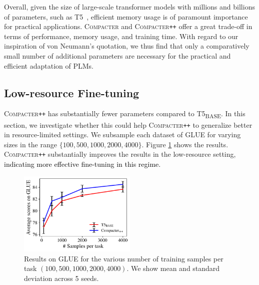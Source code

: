 \documentclass{article}
\newcommand{\change}[1]{\textcolor{black}{#1}}
\newcommand{\basebase}{T5\textsubscript{\tiny BASE}\xspace}
\newcommand{\compacter}{\textsc{Compacter}\xspace}
\newcommand{\compacteronlyff}{\textsc{Compacter}\texttt{++}\xspace} %
\begin{document}
Overall, given the size of large-scale transformer models with millions and billions of parameters, such as T5~\citep{raffel2019exploring}, efficient memory usage is of paramount importance for practical applications. \compacter and \compacteronlyff offer a great trade-off in terms of performance, memory usage, and training time. With regard to our inspiration of von Neumann's quotation, we thus find that only a comparatively small number of additional parameters are necessary for the practical and efficient adaptation of PLMs.

\subsection{Low-resource Fine-tuning} \label{sec:low_resource}
\compacteronlyff has substantially fewer parameters compared to \basebase. In this section, we investigate whether this could help \compacteronlyff to generalize better in resource-limited settings. We subsample each dataset of GLUE for varying sizes in the range $\{100, 500, 1000, 2000, 4000\}$. Figure \ref{fig:lowresource_results} shows the results. \compacteronlyff substantially improves the results in the low-resource setting, \change{indicating more effective fine-tuning in this regime.} 
\begin{figure}[tp]
\centerline{
\includegraphics[width=0.5\textwidth]{figures/lowresource_plot.pdf}}\vspace{-0.6em}
\caption{Results on GLUE for the various number of training samples per task $(100, 500, 1000, 2000, 4000)$. We show mean and standard deviation across 5 seeds.} \vspace{-.5em}
\label{fig:lowresource_results}
\end{figure}

\vspace{-0.5em}
\end{document}
